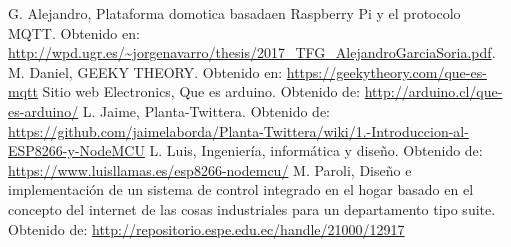 \documentclass[letterpaper, 10 pt, conference]{ieeeconf}
\begin{document}
\begin{thebibliography}{99}

 G. Alejandro, Plataforma domotica basadaen Raspberry Pi y el protocolo MQTT. Obtenido en: \url{http://wpd.ugr.es/~jorgenavarro/thesis/2017_TFG_AlejandroGarciaSoria.pdf}.
 M. Daniel, GEEKY THEORY. Obtenido en: \url{https://geekytheory.com/que-es-mqtt}
 Sitio web Electronics, Que es arduino. Obtenido de: \url{http://arduino.cl/que-es-arduino/}
 L. Jaime, Planta-Twittera. Obtenido de: \url{https://github.com/jaimelaborda/Planta-Twittera/wiki/1.-Introduccion-al-ESP8266-y-NodeMCU}
 L. Luis, Ingeniería, informática y diseño. Obtenido de: \url{https://www.luisllamas.es/esp8266-nodemcu/}
 M. Paroli, Diseño e implementación de un sistema de control integrado en el hogar basado en el concepto del internet de las cosas industriales para un departamento tipo suite. Obtenido de: \url{http://repositorio.espe.edu.ec/handle/21000/12917}

\end{thebibliography}
\end{document}
